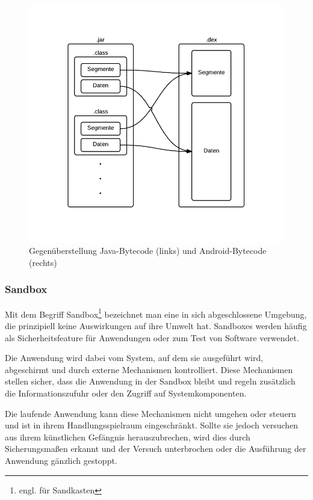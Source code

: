  \begin{figure}[h!t]
 \begin{center}
 \includegraphics[scale=0.5]{images/dexjar}
 \caption{Gegenüberstellung Java-Bytecode (links) und Android-Bytecode (rechts)}
 \label{dexjar}
 \end{center}
 \end{figure}
 
\subsubsection{Sandbox}
\label{sandbox}

Mit dem Begriff Sandbox\footnote{engl. für Sandkasten} bezeichnet man eine in sich abgeschlossene Umgebung, die prinzipiell keine Auswirkungen auf ihre Umwelt hat. Sandboxes werden häufig als Sicherheitsfeature für Anwendungen oder zum Test von Software verwendet.

Die Anwendung wird dabei vom System, auf dem sie ausgeführt wird, abgeschirmt und durch externe Mechanismen kontrolliert. Diese Mechanismen stellen sicher, dass die Anwendung in der Sandbox bleibt und regeln zusätzlich die Informationszufuhr oder den Zugriff auf Systemkomponenten.

Die laufende Anwendung kann diese Mechanismen nicht umgehen oder steuern und ist in ihrem Handlungsspielraum eingeschränkt. Sollte sie jedoch versuchen aus ihrem künstlichen Gefängnis herauszubrechen, wird dies durch Sicherungsmaßen erkannt und der Versuch unterbrochen oder die Ausführung der Anwendung gänzlich gestoppt.

